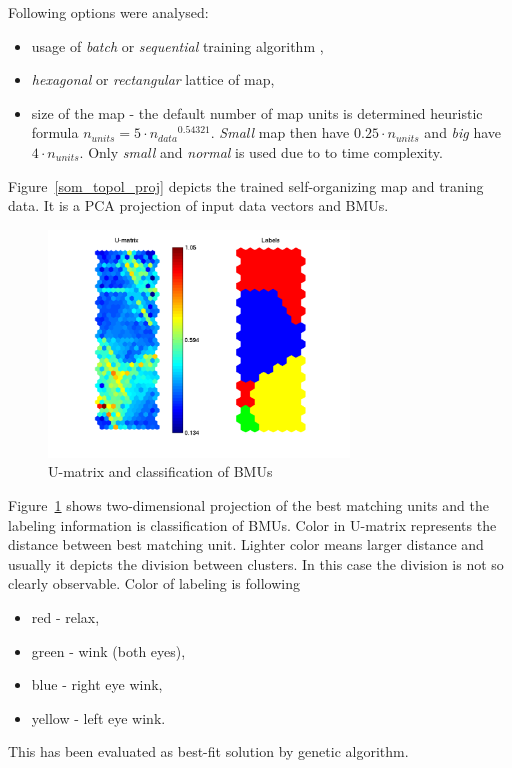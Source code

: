 \documentclass[a4paper,jurnal]{IEEEtran}
\begin{document}
Following options were analysed:
\begin{itemize}
	\item usage of \textit{batch} or \textit{sequential} training algorithm 
	\cite{somtoolbox},
	\item \textit{hexagonal} or \textit{rectangular} lattice of map,
	\item size of the map - the default number of map units is determined heuristic formula 
	$ n_{units} = 5\cdot {n_{data}}^{0.54321} $. \textit{Small} map then
	have $ 0.25\cdot n_{units} $ and \textit{big} have $ 4\cdot n_{units} $. Only
	\textit{small} and \textit{normal} is used due to to time complexity.
\end{itemize}

Figure~\ref{som_topol_proj} depicts the trained self-organizing map and traning data.
It is a PCA projection of input data vectors and BMUs.

\begin{figure}[h]
	\centering
	\includegraphics[width=80mm]{som_umat}
	\caption{U-matrix and classification of BMUs}
	\label{som_umat}
\end{figure}
Figure~\ref{som_umat} shows two-dimensional projection of the best matching units and
the labeling information is classification of BMUs. 
Color in U-matrix represents the distance between best matching unit. Lighter color
means larger distance and usually it depicts the division between clusters. In this case
the division is not so clearly observable. Color of labeling is following
\begin{itemize}
	\item  red - relax,
	\item green - wink (both eyes),
	\item blue - right eye wink,
	\item yellow - left eye wink.
\end{itemize}

This has been evaluated as best-fit solution by genetic algorithm.
\end{document}
